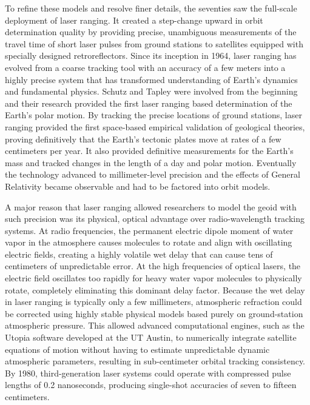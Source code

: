 To refine these models and resolve finer details, the seventies saw the full-scale deployment of laser ranging. It created a step-change upward in orbit determination quality by providing precise, unambiguous measurements of the travel time of short laser pulses from ground stations to satellites equipped with specially designed retroreflectors. Since its inception in 1964, laser ranging has evolved from a coarse tracking tool with an accuracy of a few meters into a highly precise system that has transformed understanding of Earth's dynamics and fundamental physics. Schutz and Tapley were involved from the beginning and their research provided the first laser ranging based determination of the Earth's polar motion. By tracking the precise locations of ground stations, laser ranging provided the first space-based empirical validation of geological theories, proving definitively that the Earth's tectonic plates move at rates of a few centimeters per year. It also provided definitive measurements for the Earth's mass and tracked changes in the length of a day and polar motion. Eventually the technology advanced to millimeter-level precision and the effects of General Relativity became observable and had to be factored into orbit models. 

A major reason that laser ranging allowed researchers to model the geoid with such precision was its physical, optical advantage over radio-wavelength tracking systems. At radio frequencies, the permanent electric dipole moment of water vapor in the atmosphere causes molecules to rotate and align with oscillating electric fields, creating a highly volatile wet delay that can cause tens of centimeters of unpredictable error. At the high frequencies of optical lasers, the electric field oscillates too rapidly for heavy water vapor molecules to physically rotate, completely eliminating this dominant delay factor. Because the wet delay in laser ranging is typically only a few millimeters, atmospheric refraction could be corrected using highly stable physical models based purely on ground-station atmospheric pressure. This allowed advanced computational engines, such as the Utopia software developed at the UT Austin, to numerically integrate satellite equations of motion without having to estimate unpredictable dynamic atmospheric parameters, resulting in sub-centimeter orbital tracking consistency. By 1980, third-generation laser systems could operate with compressed pulse lengths of 0.2 nanoseconds, producing single-shot accuracies of seven to fifteen centimeters.

